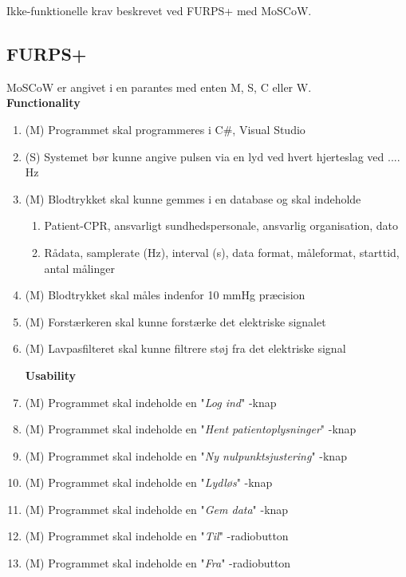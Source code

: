 Ikke-funktionelle krav beskrevet ved FURPS+ med MoSCoW.

\subsection{FURPS+}
MoSCoW er angivet i en parantes med enten M, S, C eller W. 
\\

\textbf{Functionality}
\begin{enumerate}
\item (M) Programmet skal programmeres i C$\#$, Visual Studio
\item (S) Systemet bør kunne angive pulsen via en lyd ved hvert hjerteslag ved .... Hz
\item (M) Blodtrykket skal kunne gemmes i en database og skal indeholde 
\begin{enumerate} 
\item Patient-CPR, ansvarligt sundhedspersonale, ansvarlig organisation, dato
\item Rådata, samplerate (Hz), interval (s), data format, måleformat, starttid, antal målinger
\end{enumerate}
\item (M) Blodtrykket skal måles indenfor 10 mmHg præcision
\item (M) Forstærkeren skal kunne forstærke det elektriske signalet 
\item (M) Lavpasfilteret skal kunne filtrere støj fra det elektriske signal

\noindent 
\textbf{Usability}
\item (M) Programmet skal indeholde en "\textit{Log ind}"\- -knap
\item (M) Programmet skal indeholde en "\textit{Hent patientoplysninger}"\- -knap
\item (M) Programmet skal indeholde en "\textit{Ny nulpunktsjustering}"\- -knap
\item (M) Programmet skal indeholde en "\textit{Lydløs}"\- -knap
\item (M) Programmet skal indeholde en "\textit{Gem data}"\- -knap
\item (M) Programmet skal indeholde en "\textit{Til}"\- -radiobutton
\item (M) Programmet skal indeholde en "\textit{Fra}"\- -radiobutton


\end{enumerate}
